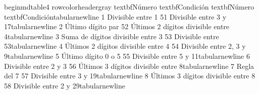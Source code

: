 \markdownRendererDocumentBegin
\markdownRendererSectionBegin
\markdownRendererSectionBegin
\markdownRendererSectionBegin
{}\markdownRendererInterblockSeparator
{}\markdownRendererBackslash{}begin\markdownRendererLeftBrace{}mdtable4\markdownRendererRightBrace{}\markdownRendererSoftLineBreak
{}\markdownRendererBackslash{}rowcolor\markdownRendererLeftBrace{}headergray\markdownRendererRightBrace{}\markdownRendererSoftLineBreak
{}\markdownRendererBackslash{}textbf\markdownRendererLeftBrace{}Número\markdownRendererRightBrace{} \markdownRendererAmpersand{} \markdownRendererBackslash{}textbf\markdownRendererLeftBrace{}Condición\markdownRendererRightBrace{} \markdownRendererAmpersand{} \markdownRendererBackslash{}textbf\markdownRendererLeftBrace{}Número\markdownRendererRightBrace{} \markdownRendererAmpersand{} \markdownRendererBackslash{}textbf\markdownRendererLeftBrace{}Condición\markdownRendererRightBrace{}\markdownRendererBackslash{}tabularnewline\markdownRendererSoftLineBreak
{}1 \markdownRendererAmpersand{} Divisible entre 1 \markdownRendererAmpersand{} 51 \markdownRendererAmpersand{} Divisible entre 3 y 17\markdownRendererBackslash{}tabularnewline\markdownRendererSoftLineBreak
{}2 \markdownRendererAmpersand{} Último dígito par \markdownRendererAmpersand{} 52 \markdownRendererAmpersand{} Últimos 2 dígitos divisible entre 4\markdownRendererBackslash{}tabularnewline\markdownRendererSoftLineBreak
{}3 \markdownRendererAmpersand{} Suma de dígitos divisible entre 3 \markdownRendererAmpersand{} 53 \markdownRendererAmpersand{} Divisible entre 53\markdownRendererBackslash{}tabularnewline\markdownRendererSoftLineBreak
{}4 \markdownRendererAmpersand{} Últimos 2 dígitos divisible entre 4 \markdownRendererAmpersand{} 54 \markdownRendererAmpersand{} Divisible entre 2, 3 y 9\markdownRendererBackslash{}tabularnewline\markdownRendererSoftLineBreak
{}5 \markdownRendererAmpersand{} Último dígito 0 o 5 \markdownRendererAmpersand{} 55 \markdownRendererAmpersand{} Divisible entre 5 y 11\markdownRendererBackslash{}tabularnewline\markdownRendererSoftLineBreak
{}6 \markdownRendererAmpersand{} Divisible entre 2 y 3 \markdownRendererAmpersand{} 56 \markdownRendererAmpersand{} Últimos 3 dígitos divisible entre 8\markdownRendererBackslash{}tabularnewline\markdownRendererSoftLineBreak
{}7 \markdownRendererAmpersand{} Regla del 7 \markdownRendererAmpersand{} 57 \markdownRendererAmpersand{} Divisible entre 3 y 19\markdownRendererBackslash{}tabularnewline\markdownRendererSoftLineBreak
{}8 \markdownRendererAmpersand{} Últimos 3 dígitos divisible entre 8 \markdownRendererAmpersand{} 58 \markdownRendererAmpersand{} Divisible entre 2 y 29\markdownRendererBackslash{}tabularnewline\markdownRendererSoftLineBreak
